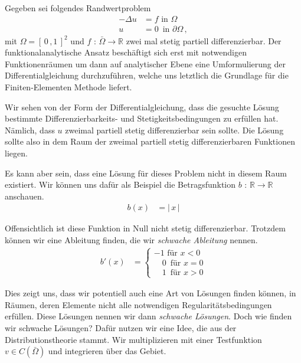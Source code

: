 Gegeben sei folgendes Randwertproblem
\begin{equation} \label{eq:dg}
\begin{aligned}
	- \Delta u &= f \text{ in } \Omega \\
	u &= 0 \, \text{ in } \partial \Omega \, ,
\end{aligned}
\end{equation}
mit $\Omega = [ \, 0 \, ,1 \, ]^{2}$ und $f$ : $\bar{\Omega} \rightarrow \mathbb{R}$ zwei mal stetig partiell differenzierbar.
Der funktionalanalytische Ansatz beschäftigt sich erst mit notwendigen Funktionenräumen um dann auf analytischer Ebene eine Umformulierung der Differentialgleichung durchzuführen, welche uns letztlich die Grundlage für die Finiten-Elementen Methode liefert.

Wir sehen von der Form der Differentialgleichung, dass die gesuchte Lösung bestimmte Differenzierbarkeits- und Stetigkeitsbedingungen zu erfüllen hat. Nämlich, dass $u$ zweimal partiell stetig differenzierbar sein sollte. Die Lösung sollte also in dem Raum der zweimal partiell stetig differenzierbaren Funktionen liegen.

Es kann aber sein, dass eine Lösung für dieses Problem nicht in diesem Raum existiert. Wir können uns dafür als Beispiel die Betragsfunktion $b$ : $\mathbb{R} \rightarrow \mathbb{R}$ anschauen.
\begin{equation}
\begin{aligned}
b(x) &= | \, x \, |
\end{aligned}
\end{equation}

Offensichtlich ist diese Funktion in Null nicht stetig differenzierbar. Trotzdem können wir eine Ableitung finden, die wir \textit{schwache Ableitung} nennen. 
\begin{equation}
\begin{aligned}
b'(x) &= 
\begin{cases}
-1 \text{ für } x < 0 \\
\, \, \text{  }0 \, \text{ für } x = 0  \\
\, \, \text{  }1 \, \text{ für } x > 0 
\end{cases}
\end{aligned}
\end{equation}

Dies zeigt uns, dass wir potentiell auch eine Art von Lösungen finden können, in Räumen, deren Elemente nicht alle notwendigen Regularitätsbedingungen erfüllen. Diese Lösungen nennen wir dann \textit{schwache Lösungen}. Doch wie finden wir schwache Lösungen?
Dafür nutzen wir eine Idee, die aus der Distributionstheorie stammt.
Wir multiplizieren mit einer Testfunktion $v \in C(\bar{\Omega})$  und integrieren über das Gebiet.

